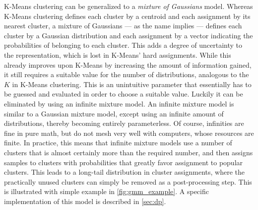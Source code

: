 K-Means clustering can be generalized to a \emph{mixture of Gaussians} model.
Whereas K-Means clustering defines each cluster by a centroid and each
assignment by its nearest cluster, a mixture of Gaussians --- as the name
implies --- defines each cluster by a Gaussian distribution and each assignment
by a vector indicating the probabilities of belonging to each cluster. This adds
a degree of uncertainty to the representation, which is lost in K-Means' hard
assignments. While this already improves upon K-Means by increasing the amount
of information gained, it still requires a suitable value for the number of
distributions, analogous to the $K$ in K-Means clustering. This is an
unintuitive parameter that essentially has to be guessed and evaluated in order
to choose a suitable value. Luckily it can be eliminated by using an infinite
mixture model. An infinite mixture model is similar to a Gaussian mixture model,
except using an infinite amount of distributions, thereby becoming entirely
parameterless.  Of course, infinities are fine in pure math, but do not mesh
very well with computers, whose resources are finite. In practice, this means
that infinite mixture models use a number of clusters that is almost certainly
more than the required number, and then assigns samples to clusters with
probabilities that greatly favor assignment to popular clusters. This leads to a
long-tail distribution in cluster assignments, where the practically unused
clusters can simply be removed as a post-processing step. This is illustrated
with simple example in \cref{fig:gmm_example}.  A specific implementation of
this model is described in \cref{sec:dp}.

